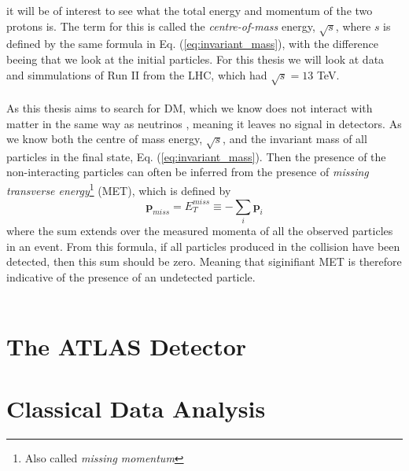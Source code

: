 \documentclass[14pt, a4paper]{book}
\begin{document}
it will be of interest to see what the total energy and momentum of the two protons is. The term for this is called the \textit{centre-of-mass} energy, $\sqrt s$, where $s$ is defined by the same formula in Eq. (\ref{eq:invariant_mass}), 
with the difference beeing that we look at the initial particles. For this thesis we will look at data and simmulations of Run II from the LHC, which had $\sqrt s = 13$ TeV. \\
\\As this thesis aims to search for DM, which we know does not interact with matter in the same way as neutrinos \cite{add sources}, meaning it leaves no signal in detectors. 
As we know both the centre of mass energy, $\sqrt s$, and the invariant mass of all particles in the final state, Eq. (\ref{eq:invariant_mass}). Then the presence of the non-interacting particles can often be 
inferred from the presence of \textit{missing transverse energy}\footnote{Also called \textit{missing momentum}} (MET), which is defined by
\begin{equation}\label{eq:MET}
    \mathbf{p}_{miss} = E_T^{miss} \equiv -\sum_i \mathbf{p}_i
\end{equation}
where the sum extends over the measured momenta of all the observed particles in an event. From this formula, if all particles produced in the collision have been detected, then this sum should be zero. Meaning that 
siginifiant MET is therefore indicative of the presence of an undetected particle. \\
\\
\clearpage
\section{The ATLAS Detector}


\clearpage
\section{Classical Data Analysis}
\end{document}
